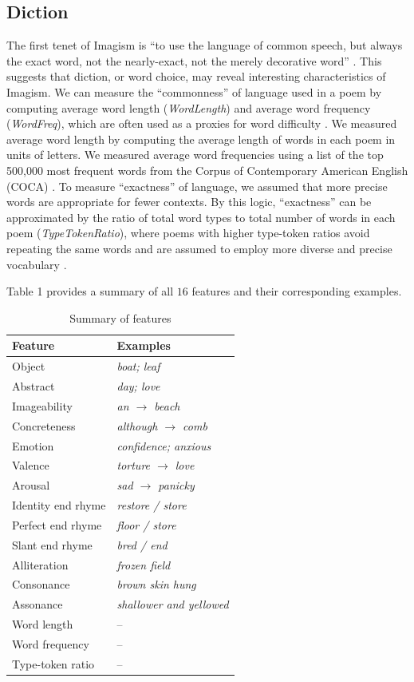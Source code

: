 \documentclass{book}
\begin{document}
\subsection{Diction}
The first tenet of Imagism is ``to use the language of common speech, but always the exact word, not the nearly-exact, not the merely decorative word'' \citep{aldington1916some}. This suggests that diction, or word choice, may reveal interesting characteristics of Imagism. We can measure the ``commonness'' of language used in a poem by computing average word length (\emph{WordLength}) and average word frequency (\emph{WordFreq}), which are often used as a proxies for word difficulty \citep{testing, frequencyDifficulty}. We measured average word length by computing the average length of words in each poem in units of letters. We measured average word frequencies using a list of the top 500,000 most frequent words from the Corpus of Contemporary American English (COCA) \citep{COCA}. To measure ``exactness'' of language, we assumed that more precise words are appropriate for fewer contexts. By this logic, ``exactness'' can be approximated by the ratio of total word types to total number of words in each poem (\emph{TypeTokenRatio}), where poems with higher type-token ratios avoid repeating the same words and are assumed to employ more diverse and precise vocabulary \citep{automaticEssay, readability}. 

Table 1 provides a summary of all $16$ features and their corresponding examples.
\begin{table}
\center
\begin{tabular}{l l }
\textbf{Feature} & \textbf{Examples} \\\hline
Object & \emph{boat; leaf} \\
Abstract & \emph{day; love} \\
Imageability & \emph{an $\rightarrow$ beach} \\
Concreteness & \emph{although $\rightarrow$ comb}\\\hline
Emotion &  \emph{confidence; anxious} \\
Valence & \emph{torture $\rightarrow$ love}\\
Arousal & \emph{sad $\rightarrow$ panicky}\\\hline
Identity end rhyme & \emph{restore / store} \\
Perfect end rhyme & \emph{floor / store} \\
Slant end rhyme & \emph{bred / end}\\
Alliteration & \emph{frozen field}\\
Consonance & \emph{brown skin hung}\\
Assonance & \emph{shallower and yellowed}\\\hline
Word length &  --\\
Word frequency &  --\\
Type-token ratio & --\\\hline
\end{tabular}
 \caption{Summary of features}
\end{table}
\end{document}
